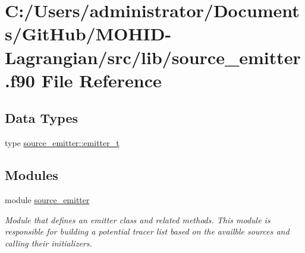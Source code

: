 \hypertarget{source__emitter_8f90}{}\section{C\+:/\+Users/administrator/\+Documents/\+Git\+Hub/\+M\+O\+H\+I\+D-\/\+Lagrangian/src/lib/source\+\_\+emitter.f90 File Reference}
\label{source__emitter_8f90}
\subsection*{Data Types}
\begin{DoxyCompactItemize}
\item 
type \mbox{\hyperlink{structsource__emitter_1_1emitter__t}{source\+\_\+emitter\+::emitter\+\_\+t}}
\end{DoxyCompactItemize}
\subsection*{Modules}
\begin{DoxyCompactItemize}
\item 
module \mbox{\hyperlink{namespacesource__emitter}{source\+\_\+emitter}}
\begin{DoxyCompactList}\small\item\em Module that defines an emitter class and related methods. This module is responsible for building a potential tracer list based on the availble sources and calling their initializers. \end{DoxyCompactList}\end{DoxyCompactItemize}
